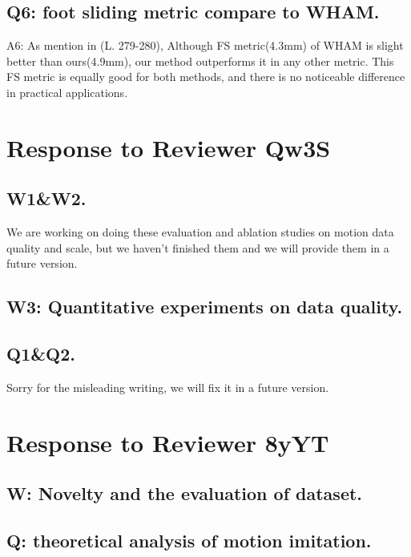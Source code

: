 \documentclass{article}
\begin{document}

\subsection{Q6: foot sliding metric compare to WHAM.}\label{q6-foot-sliding-metric-compare-to-wham.}

A6: As mention in (L. 279-280), Although FS metric(4.3mm) of WHAM is slight better than ours(4.9mm), our method outperforms it in any other metric. This FS metric is equally good for both methods, and there is no noticeable difference in practical applications.

\section{Response to Reviewer Qw3S}

\subsection{W1\&W2.} We are working on doing these evaluation and ablation studies on motion data quality and scale, but we haven't finished them and we will provide them in a future version.

\subsection{W3: Quantitative experiments on data quality.}

\subsection{Q1\&Q2.} Sorry for the misleading writing, we will fix it in a future version.

\section{Response to Reviewer 8yYT}

\subsection{W: Novelty and the evaluation of dataset.}

\subsection{Q: theoretical analysis of motion imitation.} 








\end{document}
